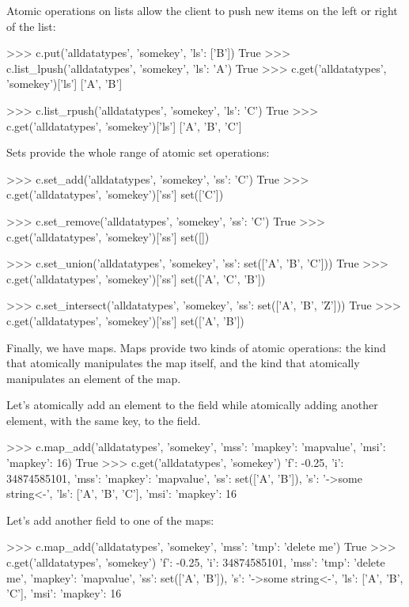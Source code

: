 Atomic operations on lists allow the client to push new items on the left or
right of the list:

\begin{pythoncode}
>>> c.put('alldatatypes', 'somekey', {'ls': ['B']})
True
>>> c.list_lpush('alldatatypes', 'somekey', {'ls': 'A'})
True
>>> c.get('alldatatypes', 'somekey')['ls']
['A', 'B']

>>> c.list_rpush('alldatatypes', 'somekey', {'ls': 'C'})
True
>>> c.get('alldatatypes', 'somekey')['ls']
['A', 'B', 'C']
\end{pythoncode}

Sets provide the whole range of atomic set operations:

\begin{pythoncode}
>>> c.set_add('alldatatypes', 'somekey', {'ss': 'C'})
True
>>> c.get('alldatatypes', 'somekey')['ss']
set(['C'])

>>> c.set_remove('alldatatypes', 'somekey', {'ss': 'C'})
True
>>> c.get('alldatatypes', 'somekey')['ss']
set([])

>>> c.set_union('alldatatypes', 'somekey', {'ss': set(['A', 'B', 'C'])})
True
>>> c.get('alldatatypes', 'somekey')['ss']
set(['A', 'C', 'B'])

>>> c.set_intersect('alldatatypes', 'somekey', {'ss': set(['A', 'B', 'Z'])})
True
>>> c.get('alldatatypes', 'somekey')['ss']
set(['A', 'B'])
\end{pythoncode}

Finally, we have maps. Maps provide two kinds of atomic operations: the kind
that atomically manipulates the map itself, and the kind that atomically
manipulates an element of the map.

Let's atomically add an element to the  field while atomically adding
another element, with the same key, to the  field.

\begin{pythoncode}
>>> c.map_add('alldatatypes', 'somekey', {'mss': {'mapkey': 'mapvalue'}, 'msi': {'mapkey': 16}})
True
>>> c.get('alldatatypes', 'somekey')
{'f': -0.25, 'i': 34874585101, 'mss': {'mapkey': 'mapvalue'}, 'ss': set(['A', 'B']), 's': '->some string<-', 'ls': ['A', 'B', 'C'], 'msi': {'mapkey': 16}}
\end{pythoncode}

Let's add another field to one of the maps:

\begin{pythoncode}
>>> c.map_add('alldatatypes', 'somekey', {'mss': {'tmp': 'delete me'}})
True
>>> c.get('alldatatypes', 'somekey')
{'f': -0.25, 'i': 34874585101, 'mss': {'tmp': 'delete me', 'mapkey': 'mapvalue'}, 'ss': set(['A', 'B']), 's': '->some string<-', 'ls': ['A', 'B', 'C'], 'msi': {'mapkey': 16}}
\end{pythoncode}

